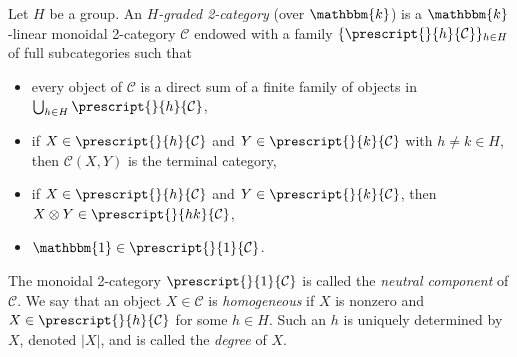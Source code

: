 \documentclass[a4paper, oneside]{amsart}
\numberwithin{equation}{subsection}
\theoremstyle{referencedlemma}
\theoremstyle{plain} %
\theoremstyle{remark}
\begin{document}
Let $H$ be a group. An \emph{$H$-graded 2-category} (over $\mathbbm{k}$) is a $\mathbbm{k}$-linear monoidal 2-category $\mathcal{C}$ endowed with a family $\{\prescript{}{h}{\mathcal{C}}\}_{h\in H}$ of full subcategories such that 
\begin{itemize}
\item every object of $\mathcal{C}$ is a direct sum of a finite family of objects in $\bigcup_{h\in H}\prescript{}{h}{\mathcal{C}}$, 
\item if $X\in \prescript{}{h}{\mathcal{C}}$ and $Y\in \prescript{}{k}{\mathcal{C}}$ with $h\neq k\in H$, then $\mathcal{C}(X,Y)$ is the terminal category,
\item if $X\in \prescript{}{h}{\mathcal{C}}$ and $Y\in \prescript{}{k}{\mathcal{C}}$, then $X\otimes Y \in \prescript{}{hk}{\mathcal{C}}$,
\item $\mathbbm{1} \in \prescript{}{1}{\mathcal{C}}$.
\end{itemize}
The monoidal 2-category $\prescript{}{1}{\mathcal{C}}$ is called the \emph{neutral component} of $\mathcal{C}$. We say that an object $X\in \mathcal{C}$ is \emph{homogeneous} if $X$ is nonzero and $X\in \prescript{}{h}{\mathcal{C}}$ for some $h\in H$. Such an $h$ is uniquely determined by $X$, denoted $\lvert X \rvert$, and is called the \emph{degree} of $X$. 
\end{document}
